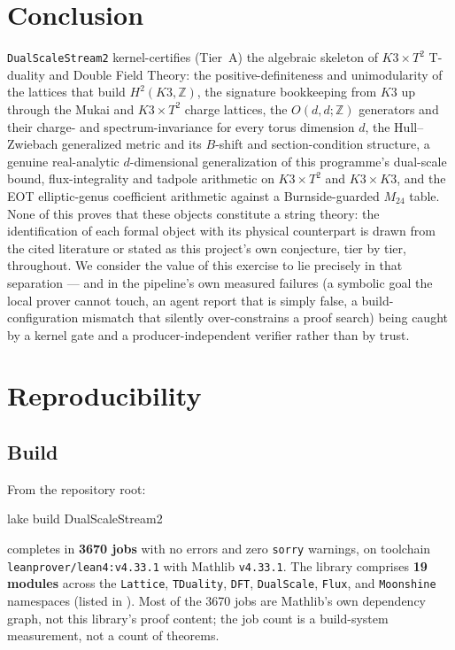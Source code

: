 \documentclass[11pt,a4paper]{article}
\theoremstyle{remark}
\begin{document}
\section{Conclusion}
\label{sec:conclusion}

\texttt{DualScaleStream2} kernel-certifies (Tier~A) the algebraic skeleton of $K3\times T^2$
T-duality and Double Field Theory: the positive-definiteness and unimodularity of the lattices
that build $H^2(K3,\mathbb{Z})$, the signature bookkeeping from $K3$ up through the Mukai and
$K3\times T^2$ charge lattices, the $O(d,d;\mathbb{Z})$ generators and their charge- and
spectrum-invariance for every torus dimension $d$, the Hull--Zwiebach generalized metric and its
$B$-shift and section-condition structure, a genuine real-analytic $d$-dimensional generalization
of this programme's dual-scale bound, flux-integrality and tadpole arithmetic on $K3\times T^2$
and $K3\times K3$, and the EOT elliptic-genus coefficient arithmetic against a Burnside-guarded
$M_{24}$ table. None of this proves that these objects constitute a string theory: the
identification of each formal object with its physical counterpart is drawn from the cited
literature or stated as this project's own conjecture, tier by tier, throughout. We consider the
value of this exercise to lie precisely in that separation --- and in the pipeline's own measured
failures (a symbolic goal the local prover cannot touch, an agent report that is simply false,
a build-configuration mismatch that silently over-constrains a proof search) being caught by a
kernel gate and a producer-independent verifier rather than by trust.

\appendix
\section{Reproducibility}
\label{app:repro}

\subsection{Build}
From the repository root:
\begin{center}
\footnotesize\ttfamily
lake build DualScaleStream2
\end{center}
completes in \textbf{3670 jobs} with no errors and zero \texttt{sorry} warnings, on toolchain
\texttt{leanprover/lean4:v4.33.1} with Mathlib \texttt{v4.33.1}. The library comprises
\textbf{19 modules} across the \texttt{Lattice}, \texttt{TDuality}, \texttt{DFT},
\texttt{DualScale}, \texttt{Flux}, and \texttt{Moonshine} namespaces (listed in
). Most of the
3670 jobs are Mathlib's own dependency graph, not this library's proof content; the job count is a
build-system measurement, not a count of theorems.
\end{document}
